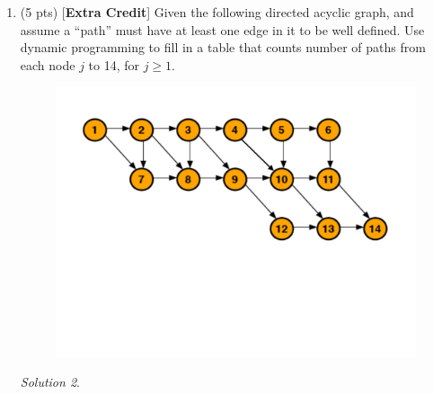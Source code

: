 \documentclass[12pt]{article}
\theoremstyle{remark}
\newtheorem*{solution}{Solution}
\begin{document}
\begin{enumerate}
\begin{enumerate}
    \item (2 pts) List out the optimal subset and provide it's weight and value.
    \begin{solution} Optimal Subset: \\ \\
\{A[0], A[1], A[3]\}, Weight = 10, Value = 9
    \end{solution}

\end{enumerate}
\pagebreak
    
        \item (5 pts) [\textbf{Extra Credit}] Given the following directed acyclic graph, and assume a ``path'' must have at least one edge in it to be well defined. Use dynamic programming to fill in a table that counts number of paths from each node $j$ to 14, for $j \geq 1$. 

        \begin{figure}[h!]
        \begin{center}
        \includegraphics[scale=0.45]{dag_ps9.pdf} 
        \end{center}
        \end{figure}
    
        \begin{solution}

        \end{solution}


\end{enumerate}
\end{document}
